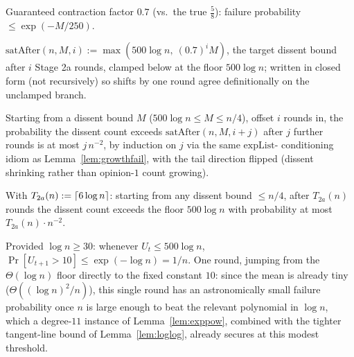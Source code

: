 \begin{lemma}\label{lem:satcontract}
  \leanok
  Guaranteed contraction factor $0.7$ (vs.\ the true $\tfrac58$): failure
  probability $\le\exp(-M/250)$.
\end{lemma}

\begin{definition}\label{def:satafter}
  \leanok
  $\mathrm{satAfter}(n,M,i) := \max(500\log n,\ (0.7)^i M)$, the target
  dissent bound after $i$ Stage 2a rounds, clamped below at the floor
  $500\log n$; written in closed form (not recursively) so shifts by one
  round agree definitionally on the unclamped branch.
\end{definition}

\begin{lemma}\label{lem:satfail}
  \leanok
  Starting from a dissent bound $M$ ($500\log n\le M\le n/4$), offset $i$
  rounds in, the probability the dissent count exceeds
  $\mathrm{satAfter}(n,M,i+j)$ after $j$ further rounds is at most
  $j\,n^{-2}$, by induction on $j$ via the same $\mathrm{expList}$-
  conditioning idiom as Lemma~\ref{lem:growthfail}, with the tail direction
  flipped (dissent shrinking rather than opinion-$1$ count growing).
\end{lemma}

\begin{lemma}\label{lem:stage2a}
  \leanok
  With $T_{2a}(n) := \left\lceil 6\log n \right\rceil$: starting from any dissent bound
  $\le n/4$, after $T_{2a}(n)$ rounds the dissent count exceeds the floor
  $500\log n$ with probability at most $T_{2a}(n)\cdot n^{-2}$.
\end{lemma}

\begin{lemma}[Stage 2b]\label{lem:stage2b}
  \leanok
  Provided $\log n\ge30$: whenever $U_t\le500\log n$,
  $\Pr[U_{t+1}>10] \le \exp(-\log n) = 1/n$. One round, jumping from the
  $\Theta(\log n)$ floor directly to the fixed constant $10$: since the
  mean is already tiny ($\Theta((\log n)^2/n)$), this single round has an
  astronomically small failure probability once $n$ is large enough to beat
  the relevant polynomial in $\log n$, which a degree-$11$ instance of
  Lemma~\ref{lem:exppow}, combined with the tighter tangent-line bound of
  Lemma~\ref{lem:loglog}, already secures at this modest threshold.
\end{lemma}

